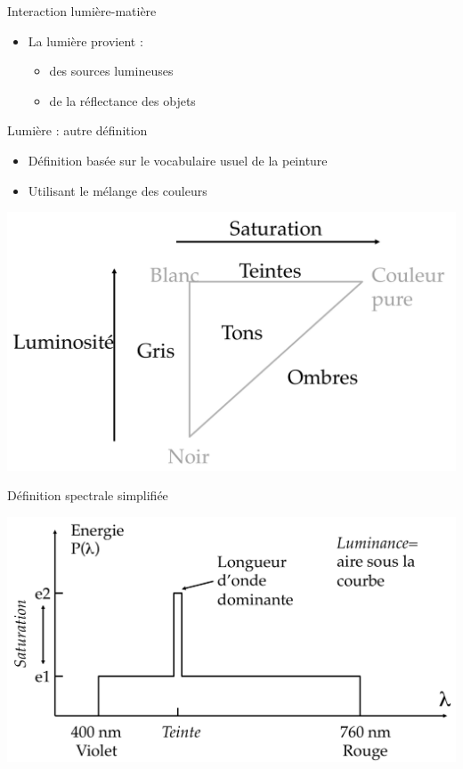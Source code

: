 \begin{frame}{Interaction lumière-matière}
\begin{center}
\end{center}
\begin{itemize}
\item La lumière provient :
\begin{itemize}
\item des sources lumineuses
\item de la réflectance des objets
\end{itemize}
\end{itemize}
\end{frame}

\begin{frame}{Lumière : autre définition}
\begin{itemize}
\item Définition basée sur le vocabulaire usuel de la peinture
\item Utilisant le mélange des couleurs
\end{itemize}
\begin{center}
\includegraphics[height=.6\textheight]{figs/lump.png}
\end{center}
\end{frame}

\begin{frame}{Définition spectrale simplifiée}
\begin{center}
\includegraphics[height=.75\textheight]{figs/lumsimpl.png}
\end{center}
\end{frame}


